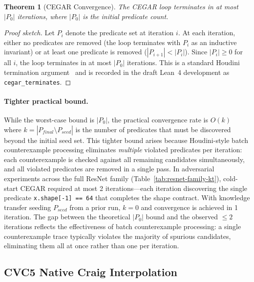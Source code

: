 \documentclass[11pt]{article}
\newtheorem{theorem}{Theorem}
\begin{document}
\begin{theorem}[CEGAR Convergence]\label{thm:cegar-converge}
The CEGAR loop terminates in at most $|P_0|$ iterations, where
$|P_0|$ is the initial predicate count.
\end{theorem}

\begin{proof}[Proof sketch]
Let $P_i$ denote the predicate set at iteration $i$.  At each iteration,
either no predicates are removed (the loop terminates with $P_i$ as an
inductive invariant) or at least one predicate is removed ($|P_{i+1}| <
|P_i|$).  Since $|P_i| \geq 0$ for all $i$, the loop terminates in at
most $|P_0|$ iterations.  This is a standard Houdini termination
argument~\cite{flanagan01} and is recorded in the draft Lean~4
development as \texttt{cegar\_terminates}.
\end{proof}

\paragraph{Tighter practical bound.}
While the worst-case bound is $|P_0|$, the practical convergence rate is
$O(k)$ where $k = |P_{\mathit{final}} \setminus P_{\mathit{seed}}|$
is the number of predicates that must be discovered beyond the initial
seed set.  This tighter bound arises because Houdini-style batch
counterexample processing eliminates \emph{multiple} violated
predicates per iteration: each counterexample is checked against
all remaining candidates simultaneously, and all violated predicates
are removed in a single pass.
In adversarial experiments across the full ResNet family
(Table~\ref{tab:resnet-family-kt}), cold-start CEGAR
required at most 2 iterations---each iteration discovering the
single predicate \texttt{x.shape[-1] == 64} that completes the
shape contract.  With knowledge transfer seeding
$P_{\mathit{seed}}$ from a prior run, $k = 0$ and convergence
is achieved in 1 iteration.  The gap between the theoretical
$|P_0|$ bound and the observed $\leq 2$ iterations reflects the
effectiveness of batch counterexample processing: a single
counterexample trace typically violates the majority of spurious
candidates, eliminating them all at once rather than one per iteration.

\subsection{CVC5 Native Craig Interpolation}
\end{document}
